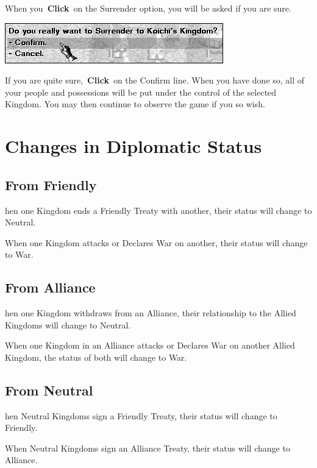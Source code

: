 When you \textbf{Click} on the Surrender option, you will be asked if you are sure.

\begin{center}
	\includegraphics[width=0.7\linewidth]{Isurrender_responce}
\end{center}

If you are quite sure, \textbf{Click} on the Confirm line. When you have done so, all of your people and possessions will be put under the control of the selected Kingdom. You may then continue to observe the game if you so wish.

\section{Changes in Diplomatic Status}


\subsection{From Friendly}

hen one Kingdom ends a Friendly Treaty with another, their status will change to Neutral.

When one Kingdom attacks or Declares War on another, their status will change to War.

\subsection{From Alliance}

hen one Kingdom withdraws from an Alliance, their relationship to the Allied Kingdoms will change to Neutral.

When one Kingdom in an Alliance attacks or Declares War on another Allied Kingdom, the status of both will change to War.

\subsection{From Neutral}

hen Neutral Kingdoms sign a Friendly Treaty, their status will change to Friendly.

When Neutral Kingdoms sign an Alliance Treaty, their status will change to Alliance.

